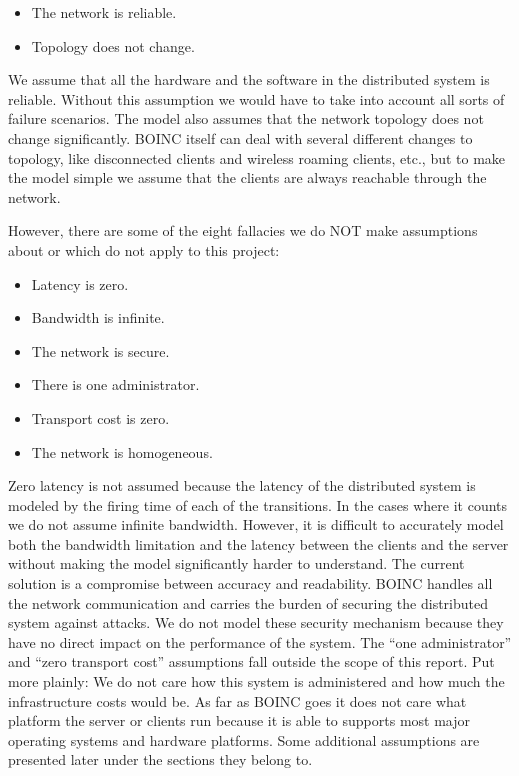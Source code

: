 \begin{itemize}
	\item The network is reliable.
	\item Topology does not change.
\end{itemize}

We assume that all the hardware and the software in the distributed system is reliable.
Without this assumption we would have to take into account all sorts of failure scenarios.
The model also assumes that the network topology does not change significantly.
BOINC itself can deal with several different changes to topology, like disconnected clients and wireless roaming clients, etc., but to make the model simple we assume that the clients are always reachable through the network.

However, there are some of the eight fallacies we do NOT make assumptions about or which do not apply to this project:

\begin{itemize}
	\item Latency is zero.
	\item Bandwidth is infinite.
	\item The network is secure.
	\item There is one administrator.
	\item Transport cost is zero.
	\item The network is homogeneous.
\end{itemize}

Zero latency is not assumed because the latency of the distributed system is modeled by the firing time of each of the transitions.
In the cases where it counts we do not assume infinite bandwidth.
However, it is difficult to accurately model both the bandwidth limitation and the latency between the clients and the server without making the model significantly harder to understand.
The current solution is a compromise between accuracy and readability.
BOINC handles all the network communication and carries the burden of securing the distributed system against attacks.
We do not model these security mechanism because they have no direct impact on the performance of the system.
The ``one administrator'' and ``zero transport cost'' assumptions fall outside the scope of this report.
Put more plainly: We do not care how this system is administered and how much the infrastructure costs would be.
As far as BOINC goes it does not care what platform the server or clients run because it is able to supports most major operating systems and hardware platforms.
Some additional assumptions are presented later under the sections they belong to.


